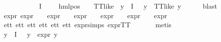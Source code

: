\begin{isabellebody}
\ \ \isamarkupfalse%
\ \isamarkupfalse%
\ {\isasymphi}\ \ {\isachardoublequoteopen}{\isasymphi}\ {\isasymin}\ {\isasymPhi}\ {\isacharbackquote}{\kern0pt}\ I{\isachardoublequoteclose}\ {\isachardoublequoteopen}{\isacharparenleft}{\kern0pt}{\isasymexists}{\isasymalpha}\ {\isasymchi}{\isachardot}{\kern0pt}\ {\isasymphi}\ {\isacharequal}{\kern0pt}\ hml{\isacharunderscore}{\kern0pt}pos\ {\isasymalpha}\ {\isasymchi}\ {\isasymand}\ TT{\isacharunderscore}{\kern0pt}like\ {\isasymchi}{\isacharparenright}{\kern0pt}{\isachardoublequoteclose}\ {\isachardoublequoteopen}{\isacharparenleft}{\kern0pt}{\isasymforall}y{\isasymin}{\isasymPhi}\ {\isacharbackquote}{\kern0pt}\ I{\isachardot}{\kern0pt}\ {\isasymphi}\ {\isasymnoteq}\ y\ {\isasymlongrightarrow}\ TT{\isacharunderscore}{\kern0pt}like\ y{\isacharparenright}{\kern0pt}{\isachardoublequoteclose}\isanewline
\ \ \ \ \isamarkupfalse%
\ blast\isanewline
\ \ \isamarkupfalse%
\ expr{\isacharunderscore}{\kern0pt}{\isasymphi}{\isacharcolon}{\kern0pt}\ {\isachardoublequoteopen}expr{\isacharunderscore}{\kern0pt}{}\ {\isasymphi}\ {\isacharequal}{\kern0pt}\ {}{\isachardoublequoteclose}\ {\isachardoublequoteopen}expr{\isacharunderscore}{\kern0pt}{}\ {\isasymphi}\ {\isacharequal}{\kern0pt}\ {}{\isachardoublequoteclose}\ {\isachardoublequoteopen}expr{\isacharunderscore}{\kern0pt}{}\ {\isasymphi}\ {\isacharequal}{\kern0pt}\ {}{\isachardoublequoteclose}\ {\isachardoublequoteopen}expr{\isacharunderscore}{\kern0pt}{}\ {\isasymphi}\ {\isacharequal}{\kern0pt}\ {}{\isachardoublequoteclose}\ {\isachardoublequoteopen}expr{\isacharunderscore}{\kern0pt}{}\ {\isasymphi}\ {\isacharequal}{\kern0pt}\ {}{\isachardoublequoteclose}\ {\isachardoublequoteopen}expr{\isacharunderscore}{\kern0pt}{}\ {\isasymphi}\ {\isacharequal}{\kern0pt}\ {}{\isachardoublequoteclose}\isanewline
\ \ \ \ \isamarkupfalse%
\ e{}{\isacharunderscore}{\kern0pt}tt\ e{}{\isacharunderscore}{\kern0pt}tt\ e{}{\isacharunderscore}{\kern0pt}tt\ e{}{\isacharunderscore}{\kern0pt}tt\ e{}{\isacharunderscore}{\kern0pt}tt\ e{}{\isacharunderscore}{\kern0pt}tt\ expr{\isachardot}{\kern0pt}simps\ expr{\isacharunderscore}{\kern0pt}TT\ \isanewline
\ \ \ \ \isamarkupfalse%
\ metis{\isacharplus}{\kern0pt}\isanewline
\ \ \isamarkupfalse%
\ {\isachardoublequoteopen}{\isacharparenleft}{\kern0pt}{\isasymforall}y{\isasymin}{\isasymPhi}\ {\isacharbackquote}{\kern0pt}\ I{\isachardot}{\kern0pt}\ {\isasymphi}\ {\isasymnoteq}\ y\ {\isasymlongrightarrow}\ expr{\isacharunderscore}{\kern0pt}{}\ y\ {\isacharequal}{\kern0pt}\ {}{\isacharparenright}{\kern0pt}{\isachardoublequoteclose}\isanewline

\end{isabellebody}
